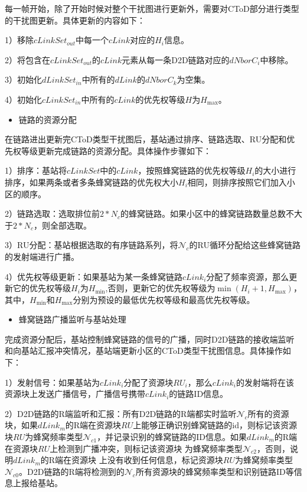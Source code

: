 \documentclass[figurelist,tablelist,algorithmlist,nomlist,masters]{seuthesix}
\begin{document}
	每一帧开始，除了开始时候对整个干扰图进行更新外，需要对CToD部分进行类型的干扰图更新。具体更新的内容如下：
	
	1）移除$cLinkSet_{out}$中每一个$cLink$对应的${H_i}$信息。
	
	2）将包含在$cLinkSet_{out}$的$cLink$元素从每一条D2D链路对应的$dNborC_i$中移除。
	
	3）初始化$dLinkSet_{in}$中所有的$dLink$的$dNborC_k$为空集。
	
	4）初始化$cLinkSet_{in}$中所有的$cLink$的优先权等级${H}$为${H_{\max }}$。
	
	\begin{itemize}
		\item 链路的资源分配
	\end{itemize}
	
	在链路进出更新完CToD类型干扰图后，基站通过排序、链路选取、RU分配和优先权等级更新完成链路的资源分配。具体操作步骤如下：
	
	1）排序：基站将$cLinkSet$中的$cLink$，按照蜂窝链路的优先权等级${H_i}$的大小进行排序，如果两条或者多条蜂窝链路的优先权大小${H_i}$相同，则排序按照它们加入小区的顺序。
	
	2）链路选取：选取排位前$2*N_c$的蜂窝链路。如果小区中的蜂窝链路数量总数不大于$2*N_c$，则全部选取。
	
	3）RU分配：基站根据选取的有序链路系列，将$\mathcal{N}_c$的RU循环分配给这些蜂窝链路的发射端进行广播。
	
	4）优先权等级更新：如果基站为某一条蜂窝链路$cLink_i$分配了频率资源，那么更新它的优先权等级${H_i}$为${H_{\min }}$,否则，更新它的优先权等级为$\min ({H_i} + 1,{H_{\max }})$，其中，${H_{\min }}$和${H_{\max }}$分别为预设的最低优先权等级和最高优先权等级。
	
	\begin{itemize}
		\item 蜂窝链路广播监听与基站处理
	\end{itemize}
	
	完成资源分配后，基站控制蜂窝链路的信号的广播，同时D2D链路的接收端监听和向基站汇报冲突情况，基站端更新小区的CToD类型干扰图信息。具体操作如下：
	
	1）发射信号：如果基站为$cLink_i$分配了资源块$RU_i$，那么$cLink_i$的发射端将在该资源块上发送广播信号，广播信号携带$cLink_i$的链路ID信息。
	
	2）D2D链路的R端监听和汇报：所有D2D链路的R端都实时监听$\mathcal{N}_c$所有的资源块，如果$dLink_m$的R端在资源块$RU$上能够正确识别蜂窝链路的id，则标记该资源块$RU$为蜂窝频率类型$\mathcal{N}_{c1}$，并记录识别的蜂窝链路的ID信息。如果$dLink_m$的R端在资源块$RU$上检测到广播冲突，则标记该资源块 为蜂窝频率类型$\mathcal{N}_{c2}$，否则，说明$dLink_m$的R端在资源块 上没有收到任何信息，标记资源块$RU$为蜂窝频率类型$\mathcal{N}_{c0}$。D2D链路的R端将检测到的$\mathcal{N}_c$所有资源块的蜂窝频率类型和识别链路ID等信息上报给基站。
	
\end{document}
